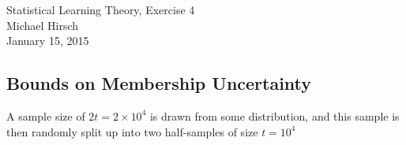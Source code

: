 \documentclass[]{book}
\theoremstyle{definition}
\begin{document}
\begin{center}
{\Large Statistical Learning Theory, Exercise 4}\\
Michael Hirsch\\ %
January 15, 2015 %
\end{center}

\vspace{0.2 cm}


\subsection*{Bounds on Membership Uncertainty}

A sample size of $2t = 2 \times 10^{4}$ is drawn from some distribution, and this sample is then randomly split up into two half-samples of size $t = 10^{4}$
\end{document}
